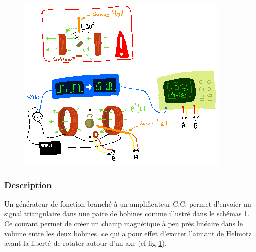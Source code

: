 \documentclass[a4paper,12pt,oneside]{article}
\begin{document}
\begin{figure}[h!]
  \begin{center}
  \includegraphics[width=1\linewidth,angle=0]{./figures/pendule_2.png}
  \caption{} \label{fig:pendule_2}
  \end{center}
\end{figure}


\subsubsection{Description}
\label{description}

Un générateur de fonction branché à un amplificateur C.C. permet d'envoier un signal triangulaire dans une paire de bobines comme illustré dans le schémas \ref{fig:pendule_2}. Ce courant permet de créer un champ magnétique à peu près linéaire dans le volume entre les deux bobines, ce qui a pour effet d'exciter l'aimant de Helmotz ayant la liberté de rotater autour d'un axe (cf fig \ref{fig:pendule_2}).
\end{document}
